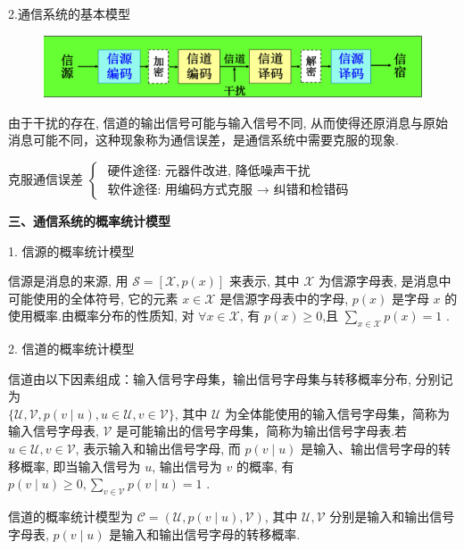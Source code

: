 2.通信系统的基本模型
\begin{figure}[ht]
    \centering
    \includegraphics[width=0.5\linewidth]{image/0.png}
\end{figure}
由于干扰的存在, 信道的输出信号可能与输入信号不同, 从而使得还原消息与原始消息可能不同，这种现象称为通信误差，是通信系统中需要克服的现象.

克服通信误差 $ \left\{\begin{array}{l}\text { 硬件途径: 元器件改进, 降低噪声干扰 } \\ \text { 软件途径: 用编码方式克服 } \rightarrow \text { 纠错和检错码 }\end{array}\right. $


\textbf{三、通信系统的概率统计模型}

1. 信源的概率统计模型

\begin{definition}
    信源是消息的来源, 用 $ \mathscr{S}=[\mathscr{X}, p(x)] $ 来表示, 其中 $ \mathscr{X} $ 为信源字母表, 是消息中可能使用的全体符号, 它的元素 $ x \in \mathscr{X} $ 是信源字母表中的字母, $ p(x) $ 是字母 $ x $ 的使用概率.由概率分布的性质知, 对 $ \forall x \in \mathscr{X} $, 有 $ p(x) \geqslant 0 $,且 $ \sum\limits_{x \in \mathscr{X}} p(x)=1 $ .
\end{definition}


2. 信道的概率统计模型

信道由以下因素组成：输入信号字母集，输出信号字母集与转移概率分布, 分别记为\\ $ \{\mathscr{U}, \mathscr{V}, p(v \mid u), u \in \mathscr{U}, v \in \mathscr{V}\} $, 其中 $ \mathscr{U} $ 为全体能使用的输入信号字母集，简称为输入信号字母表, $ \mathscr{V} $ 是可能输出的信号字母集，简称为输出信号字母表.若 $ u \in \mathscr{U}, v \in \mathscr{V} $, 表示输入和输出信号字母, 而 $ p(v \mid u) $ 是输入、输出信号字母的转移概率, 即当输入信号为 $ u $, 输出信号为 $ v $ 的概率, 有 $ p(v \mid u) \geqslant 0, \sum\limits_{v \in \mathscr{V}} p(v \mid u)=1 $ .

\begin{definition}
    信道的概率统计模型为 $ \mathscr{C}=(\mathscr{U}, p(v \mid u), \mathscr{V}) $, 其中 $ \mathscr{U}, \mathscr{V} $ 分别是输入和输出信号字母表, $ p(v \mid u) $ 是输入和输出信号字母的转移概率.
\end{definition}



